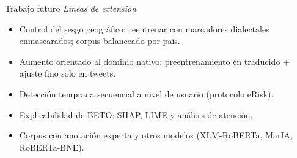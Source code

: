 ﻿\documentclass[11pt,aspectratio=169]{beamer}
\newcommand{\ugrsubtitle}[1]{%
  \vskip-0.25cm
  \small\textcolor{ugrGris}{\emph{#1}}\par
  \vskip0.15cm
}
\begin{document}
\begin{frame}{Trabajo futuro}
  \ugrsubtitle{Líneas de extensión}
  \begin{itemize}
    \item Control del sesgo geográfico: reentrenar con marcadores dialectales enmascarados; corpus balanceado por país.
    \item Aumento orientado al dominio nativo: preentrenamiento en traducido + ajuste fino solo en tweets.
    \item Detección temprana secuencial a nivel de usuario (protocolo eRisk).
    \item Explicabilidad de BETO: SHAP, LIME y análisis de atención.
    \item Corpus con anotación experta y otros modelos (XLM-RoBERTa, MarIA, RoBERTa-BNE).
  \end{itemize}
\end{frame}

\begin{frame}[plain]
\end{frame}
\end{document}

